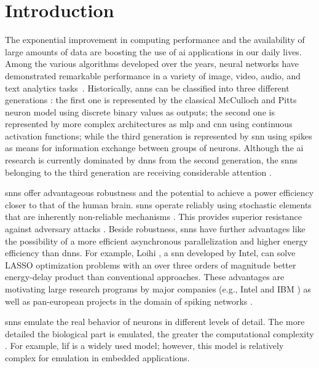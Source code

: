 \section{Introduction}
\label{sec:introduction}
The exponential improvement in computing performance and the availability of large amounts of data are boosting the use of \gls{ai} applications in our daily lives. Among the various algorithms developed over the years, neural networks have demonstrated remarkable performance in a variety of image, video, audio, and text analytics tasks~\cite{schmidhuber2015deep,Taigman_2014_CVPR}. Historically, \glspl{ann} can be classified into three different generations \cite{Design_Exploration_SbS_Trans20}: the first one is represented by the classical McCulloch and Pitts neuron model using discrete binary values as outputs; the second one is represented by more complex architectures as \gls{mlp} and \gls{cnn} using continuous activation functions; while the third generation is represented by \gls{snn} using spikes as means for information exchange between groups of neurons. Although the \gls{ai} research is currently dominated by \glspl{dnn} from the second generation, the \glspl{snn} belonging to the third generation are receiving considerable attention \cite{Spinnaker_Trans13,ernst2007efficient,Design_Exploration_SbS_Trans20, SNN_Survey_Trans19}.

\glspl{snn} offer advantageous robustness and the potential to achieve a power efficiency closer to that of the human brain.
\glspl{snn} operate reliably using stochastic elements that are inherently non-reliable mechanisms \cite{mcdonnell2011benefits}.
This provides superior resistance against adversary attacks
\cite{ernst2007efficient, Dapello2020.06.16.154542}. Beside
robustness, \glspl{snn} have further advantages like the possibility of a more efficient asynchronous parallelization and higher
energy efficiency than \glspl{dnn}. For
example, Loihi \cite{davies2018loihi}, a \gls{snn} developed by Intel, can
solve LASSO optimization problems with an over three orders of
magnitude better energy-delay product than conventional
approaches. These advantages are motivating large research programs by
major companies (e.g., Intel \cite{davies2018loihi} and IBM
\cite{TrueNorth_Trans15}) as well as pan-european projects in the
domain of spiking networks \cite{Spinnaker_Trans13}.


\glspl{snn} emulate the real behavior of neurons in different levels of detail. The more detailed the biological part is emulated, the greater the computational complexity \cite{izhikevich2004model,amunts2019human}. For example, \gls{lif} is a widely used model; however, this model is relatively complex for emulation in embedded applications.
	
